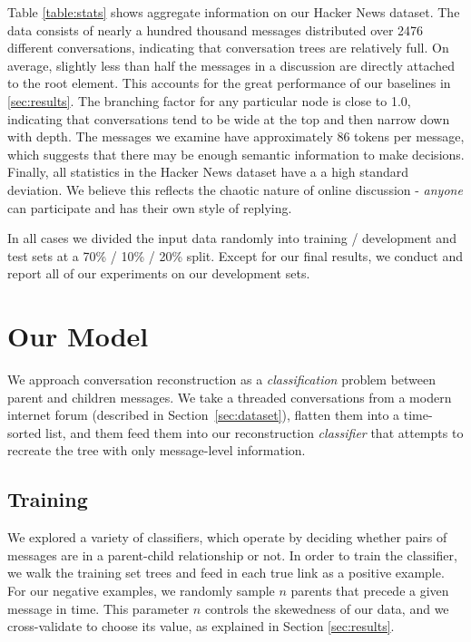\documentclass{article}
\begin{document}
Table \ref{table:stats} shows aggregate information on our Hacker News
dataset. The data consists of nearly a hundred thousand messages distributed
over 2476 different conversations, indicating that conversation trees are
relatively full. On average, slightly less than half the messages in a
discussion are directly attached to the root element. This accounts for the
great performance of our baselines in \ref{sec:results}. The branching factor
for any particular node is close to 1.0, indicating that conversations tend to
be wide at the top and then narrow down with depth. The messages we examine
have approximately 86 tokens per message, which suggests that there may be
enough semantic information to make decisions. Finally, all statistics in the
Hacker News dataset have a a high standard deviation. We believe this reflects
the chaotic nature of online discussion - \textit{anyone} can participate and
has their own style of replying.

In all cases we divided the input data randomly into training / development
and test sets at a 70\% / 10\% / 20\% split. Except for our final results, we
conduct and report all of our experiments on our development sets.

\section{Our Model}
\label{sec:approach}
We approach conversation reconstruction as a \textit{classification} problem
between parent and children messages. We take a threaded conversations from a
modern internet forum (described in Section~\ref{sec:dataset}), flatten them
into a time-sorted list, and them feed them into our reconstruction
\textit{classifier} that attempts to recreate the tree with only message-level
information.

\subsection{Training} 
We explored a variety of classifiers, which operate by deciding whether pairs
of messages are in a parent-child  relationship or not. In order to train the
classifier, we walk the training set trees  and feed in each true link as a
positive example. For our negative examples, we randomly sample $n$ parents
that precede a given message in time. This parameter $n$ controls  the
skewedness of our data, and we cross-validate to choose its value, as
explained in Section  \ref{sec:results}.
\end{document}
